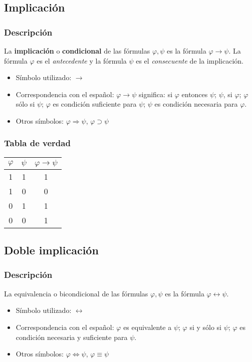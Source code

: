 \documentclass[a4paper]{article}
\begin{document}
\subsection{Implicación}
\subsubsection{Descripción}
La \textbf{implicación} o \textbf{condicional} de las fórmulas $\varphi ,\psi$ es la 
fórmula $\varphi \rightarrow \psi$. 
La fórmula $\varphi $ es el \emph{antecedente} y la
fórmula $\psi$ es el \emph{consecuente} de la implicación. 
\begin{itemize}
    \item Símbolo utilizado: \(\rightarrow\)
    \item Correspondencia con el español: $\varphi \rightarrow \psi$ significa: si $\varphi $
    entonces $\psi$; $\psi$, si $\varphi $; $\varphi $ sólo si $\psi$; $\varphi $ es 
    condición suficiente para $\psi$; $\psi$ es condición necesaria para 
    $\varphi $.
    \item Otros símbolos: \(\varphi \Rightarrow \psi\), \(\varphi \supset \psi\)
\end{itemize}
\subsubsection{Tabla de verdad}
\begin{center}
    \begin{tabular}{ccc}
    $\varphi$ & \(\psi\) & $\varphi \rightarrow  \psi$\\
    \midrule
    1 & 1 & 1 \\
    1 & 0 & 0 \\
    0 & 1 & 1 \\
    0 & 0 & 1 \\
    \end{tabular}
\end{center}
\subsection{Doble implicación}
\subsubsection{Descripción}
\noindent
La equivalencia o bicondicional de las fórmulas $\varphi ,\psi$ es la fórmula
$\varphi \leftrightarrow \psi$. 
\begin{itemize}
    \item Símbolo utilizado:  \(\leftrightarrow\)
    \item Correspondencia con el español: $\varphi$ es equivalente a $\psi$; 
    $\varphi$ si y sólo si $\psi$; $\varphi$ es condición necesaria y suficiente 
    para $\psi$.
    \item Otros símbolos: \(\varphi \Leftrightarrow \psi\), \(\varphi \equiv \psi\)
\end{itemize}
\end{document}
